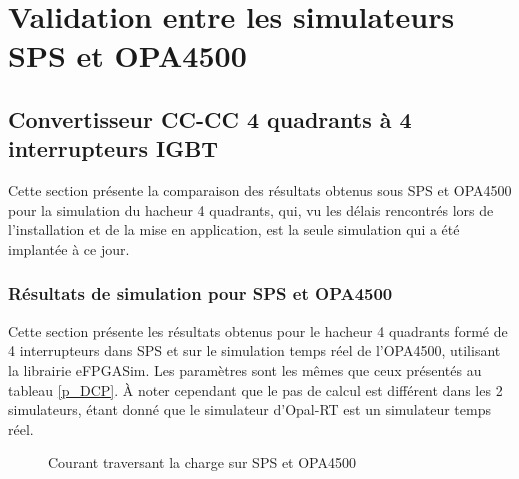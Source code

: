 \chapter{Validation entre les simulateurs SPS et OPA4500}
\section{Convertisseur CC-CC 4 quadrants à 4 interrupteurs IGBT}
Cette section présente la comparaison des résultats obtenus sous SPS et OPA4500 pour la simulation du hacheur 4 quadrants, qui, vu les délais rencontrés lors de l'installation et de la mise en application, est la seule simulation qui a été implantée à ce jour.
\subsection{Résultats de simulation pour SPS et OPA4500}
Cette section présente les résultats obtenus pour le hacheur 4 quadrants formé de 4 interrupteurs dans SPS et sur le simulation temps réel de l'OPA4500, utilisant la librairie eFPGASim. Les paramètres sont les mêmes que ceux présentés au tableau \ref{p_DCP}. À noter cependant que le pas de calcul est différent dans les 2 simulateurs, étant donné que le simulateur d'Opal-RT est un simulateur temps réel.

\begin{figure}[htb]
\caption{Courant traversant la charge sur SPS et OPA4500}
\label{SPS_OPA4500_I_load}
\end{figure} 

